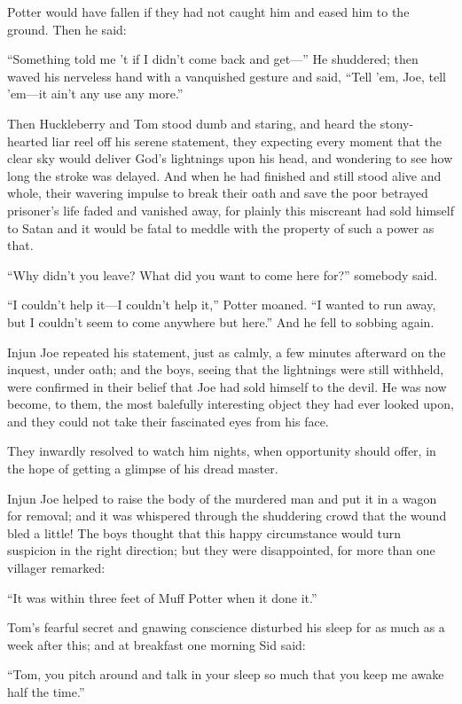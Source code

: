 \documentclass{book}
\begin{document}
Potter would have fallen if they had not caught him and eased him to the ground. Then he said:

“Something told me ’t if I didn’t come back and get—” He shuddered; then waved his nerveless hand with a vanquished gesture and said, “Tell ’em, Joe, tell ’em—it ain’t any use any more.”

Then Huckleberry and Tom stood dumb and staring, and heard the stony-hearted liar reel off his serene statement, they expecting every moment that the clear sky would deliver God’s lightnings upon his head, and wondering to see how long the stroke was delayed. And when he had finished and still stood alive and whole, their wavering impulse to break their oath and save the poor betrayed prisoner’s life faded and vanished away, for plainly this miscreant had sold himself to Satan and it would be fatal to meddle with the property of such a power as that.

“Why didn’t you leave? What did you want to come here for?” somebody said.

“I couldn’t help it—I couldn’t help it,” Potter moaned. “I wanted to run away, but I couldn’t seem to come anywhere but here.” And he fell to sobbing again.

Injun Joe repeated his statement, just as calmly, a few minutes afterward on the inquest, under oath; and the boys, seeing that the lightnings were still withheld, were confirmed in their belief that Joe had sold himself to the devil. He was now become, to them, the most balefully interesting object they had ever looked upon, and they could not take their fascinated eyes from his face.

They inwardly resolved to watch him nights, when opportunity should offer, in the hope of getting a glimpse of his dread master.

Injun Joe helped to raise the body of the murdered man and put it in a wagon for removal; and it was whispered through the shuddering crowd that the wound bled a little! The boys thought that this happy circumstance would turn suspicion in the right direction; but they were disappointed, for more than one villager remarked:

“It was within three feet of Muff Potter when it done it.”

Tom’s fearful secret and gnawing conscience disturbed his sleep for as much as a week after this; and at breakfast one morning Sid said:

“Tom, you pitch around and talk in your sleep so much that you keep me awake half the time.”
\end{document}
